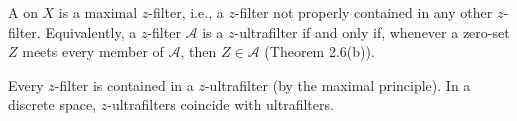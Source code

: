 A  on $X$ is a maximal $z$-filter, i.e., a $z$-filter not properly contained in any other $z$-filter. Equivalently, a $z$-filter $\mathcal{A}$ is a $z$-ultrafilter if and only if, whenever a zero-set $Z$ meets every member of $\mathcal{A}$, then $Z \in \mathcal{A}$ (Theorem 2.6(b)).

Every $z$-filter is contained in a $z$-ultrafilter (by the maximal principle). In a discrete space, $z$-ultrafilters coincide with ultrafilters.
